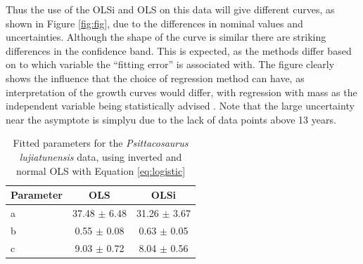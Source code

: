 \documentclass[12pt,a4paper]{article}
\begin{document}
Thus the use of the OLSi and OLS on this data will give different curves, as shown in Figure \ref{fig:fig}, due to the differences in nominal values and uncertainties. Although the shape of the curve is similar there are striking differences in the confidence band. This is expected, as the methods differ based on to which variable the “fitting error” is associated with. The figure clearly shows the influence that the choice of regression method can have, as interpretation of the growth curves would differ, with regression with mass as the independent variable being statistically advised \parencite{Kaufmann1981,Myhrvold2013}. Note that the large uncertainty near the asymptote is simplyu due to the lack of data points above 13 years. 

\begin{table}
	\centering
	\begin{tabular}{l c c}
		\hline
		Parameter & OLS  & OLSi \\
		\hline
		a & 37.48 $\pm$ 6.48 & 31.26 $\pm$ 3.67\\
		b & 0.55 $\pm$ 0.08 & 0.63 $\pm$ 0.05\\
		c & 9.03 $\pm$ 0.72 & 8.04 $\pm$ 0.56\\
		\hline
	\end{tabular}
	\caption{Fitted parameters for the \emph{Psittacosaurus lujiatunensis} data, using inverted and normal OLS with Equation \ref{eq:logistic}}\label{tab:OLS_vs_OLSi}
\end{table}
\end{document}
